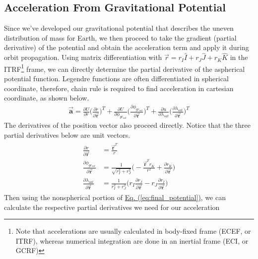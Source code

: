 \begin{multicols}{2}
\subsection{Acceleration From Gravitational Potential}
Since we've developed our gravitational potential that describes the uneven distribution of mass for Earth, we then proceed to take the gradient (partial derivative) of the potential and obtain the acceleration term and apply it during orbit propagation. Using matrix differentiation with $\vec{r} = r_I\hat{I} + r_J\hat{J} + r_K\hat{K}$ in the ITRF\footnote{Note that accelerations are usually calculated in body-fixed frame (ECEF, or ITRF), whereas numerical integration are done in an inertial frame (ECI, or GCRF)} frame, we can directly determine the partial derivative of the aspherical potential function. Legendre functions are often differentiated in spherical coordinate, therefore, chain rule is required to find acceleration in cartesian coordinate, as shown below.
\begin{gather}
    \vec{\mathbf{a}} = \frac{\partial U}{\partial r}\Bigg(\frac{\partial r}{\partial \vec{\mathbf{r}}}\Bigg)^T + \frac{\partial U}{\partial\phi_{gc_{sat}}}\Bigg(\frac{\partial\phi_{gc_{sat}}}{\partial\vec{\mathbf{r}}}\Bigg)^T + \frac{\partial u}{\partial\lambda_{sat}}\Bigg(\frac{\partial\lambda_{sat}}{\partial\vec{\mathbf{r}}}\Bigg)^T
\end{gather}
The derivatives of the position vector also proceed directly. Notice that the three partial derivatives below are unit vectors.
\begin{gather}
    \begin{split}
        \frac{\partial r}{\partial\vec{\mathbf{r}}} &= \frac{\vec{\mathbf{r}}^T}{r}\\[0.2cm]
        \frac{\partial\phi_{gc_{sat}}}{\partial\vec{\mathbf{r}}} &= \frac{1}{\sqrt{r_I^2 + r_J^2}}\Big(-\frac{\vec{\mathbf{r}}^{T}r_K}{r^2}+\frac{\partial r_K}{\partial\vec{\mathbf{r}}}\Big)\\[0.2cm]
        \frac{\partial\lambda_{sat}}{\partial\vec{\mathbf{r}}} &= \frac{1}{r_I^2+r_J^2}\Big(r_I\frac{\partial r_J}{\partial\vec{\mathbf{r}}}-r_J\frac{\partial r_I}{\partial\vec{\mathbf{r}}}\Big)
    \end{split}
\end{gather}
Then using the nonspherical portion of \hyperref[eq:final_potential]{Eq. (\ref*{eq:final_potential})}, we can calculate the respective partial derivatives we need for our acceleration
\end{multicols}

